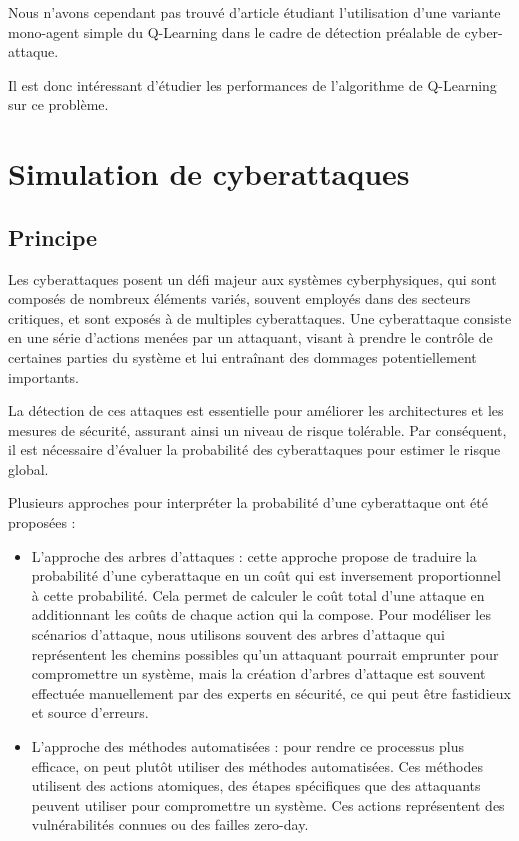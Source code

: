 \documentclass[a4paper]{article}
\begin{document}
    Nous n'avons cependant pas trouvé d'article étudiant l'utilisation d'une variante mono-agent simple du Q-Learning dans le cadre de détection préalable de cyber-attaque.

    Il est donc intéressant d'étudier les performances de l'algorithme de Q-Learning sur ce problème.

    \section{Simulation de cyberattaques}

    \subsection{Principe}

    Les cyberattaques posent un défi majeur aux systèmes cyberphysiques, qui sont composés de nombreux éléments variés, souvent employés dans des secteurs critiques, et sont exposés à de multiples cyberattaques. Une cyberattaque consiste en une série d'actions menées par un attaquant, visant à prendre le contrôle de certaines parties du système et lui entraînant des dommages potentiellement importants.

    La détection de ces attaques est essentielle pour améliorer les architectures et les mesures de sécurité, assurant ainsi un niveau de risque tolérable. Par conséquent, il est nécessaire d'évaluer la probabilité des cyberattaques pour estimer le risque global.

    Plusieurs approches pour interpréter la probabilité d’une cyberattaque ont été proposées :

    \begin{itemize}
        \item L'approche des arbres d'attaques \cite{xie_security_2013} : cette approche propose de traduire la probabilité d'une cyberattaque en un coût qui est inversement proportionnel à cette probabilité. Cela permet de calculer le coût total d'une attaque en additionnant les coûts de chaque action qui la compose. Pour modéliser les scénarios d'attaque, nous utilisons souvent des arbres d'attaque qui représentent les chemins possibles qu'un attaquant pourrait emprunter pour compromettre un système, mais la création d'arbres d'attaque est souvent effectuée manuellement par des experts en sécurité, ce qui peut être fastidieux et source d'erreurs.

        \item L’approche des méthodes automatisées \cite{ardito_artificial_2021} : pour rendre ce processus plus efficace, on peut plutôt utiliser des méthodes automatisées. Ces méthodes utilisent des actions atomiques, des étapes spécifiques que des attaquants peuvent utiliser pour compromettre un système. Ces actions représentent des vulnérabilités connues ou des failles zero-day.
    \end{itemize}
\end{document}
